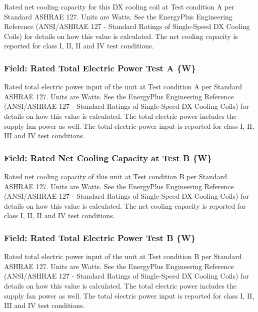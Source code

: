 Rated net cooling capacity for this DX cooling coil at Test condition A per Standard ASHRAE 127. Units are Watts. See the EnergyPlus Engineering Reference (ANSI/ASHRAE 127 - Standard Ratings of Single-Speed DX Cooling Coils) for details on how this value is calculated. The net cooling capacity is reported for class I, II, II and IV test conditions.

\subsubsection{Field: Rated Total Electric Power Test A \{W\}}\label{field-rated-total-electric-power-test-a-w}

Rated total electric power input of the unit at Test condition A per Standard ASHRAE 127. Units are Watts. See the EnergyPlus Engineering Reference (ANSI/ASHRAE 127 - Standard Ratings of Single-Speed DX Cooling Coils) for details on how this value is calculated. The total electric power includes the supply fan power as well. The total electric power input is reported for class I, II, III and IV test conditions.

\subsubsection{Field: Rated Net Cooling Capacity at Test B \{W\}}\label{field-rated-net-cooling-capacity-at-test-b-w}

Rated net cooling capacity of this unit at Test condition B per Standard ASHRAE 127. Units are Watts. See the EnergyPlus Engineering Reference (ANSI/ASHRAE 127 - Standard Ratings of Single-Speed DX Cooling Coils) for details on how this value is calculated. The net cooling capacity is reported for class I, II, II and IV test conditions.

\subsubsection{Field: Rated Total Electric Power Test B \{W\}}\label{field-rated-total-electric-power-test-b-w}

Rated total electric power input of the unit at Test condition B per Standard ASHRAE 127. Units are Watts. See the EnergyPlus Engineering Reference (ANSI/ASHRAE 127 - Standard Ratings of Single-Speed DX Cooling Coils) for details on how this value is calculated. The total electric power includes the supply fan power as well. The total electric power input is reported for class I, II, III and IV test conditions.

